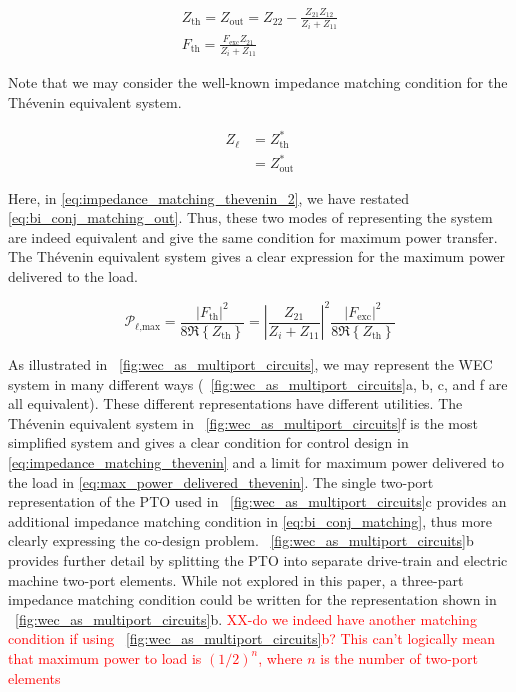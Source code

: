 \documentclass[lettersize,journal]{IEEEtran}
\newcommand{\rc}[1]{\textcolor{red}{#1}}
\begin{document}
\begin{subequations}
\begin{gather}
        Z_{\textrm{th}} = Z_{\textrm{out}} = Z_{22} - \frac{Z_{21} Z_{12}}{Z_{i} + Z_{11}} \label{eq:Thevenin_impedance} \\[0.5em]
        F_{\textrm{th}} = \frac{F_{\textrm{exc}} Z_{21}}{Z_i + Z_{11}} \label{eq:Thevenin_force}
\end{gather}
\end{subequations}

Note that we may consider the well-known impedance matching condition for the Th\'{e}venin equivalent system.

\begin{subequations}
\begin{align}
        Z_\ell &= Z_{\textrm{th}}^* \\
        &= Z_{\textrm{out}}^* \label{eq:impedance_matching_thevenin_2}
\end{align} \label{eq:impedance_matching_thevenin}
\end{subequations}

\noindent{}Here, in \eqref{eq:impedance_matching_thevenin_2}, we have restated \eqref{eq:bi_conj_matching_out}.
Thus, these two modes of representing the system are indeed equivalent and give the same condition for maximum power transfer.
The Th\'{e}venin equivalent system gives a clear expression for the maximum power delivered to the load.

\begin{equation}
        \mathcal{P}_{\ell\textrm{,max}} = \frac{| F_{\textrm{th}} |^2 }{ 8 \Re \left\{ Z_{\textrm{th}} \right\} }
        = \left| \frac{ Z_{21} }{ Z_i + Z_{11} } \right| ^2 \frac{ | F_{\textrm{exc}} |^2 }{ 8 \Re \left\{ Z_{\textrm{th}} \right\} } \label{eq:max_power_delivered_thevenin}
\end{equation}

As illustrated in \figurename~\ref{fig:wec_as_multiport_circuits}, we may represent the WEC system in many different ways (\figurename~\ref{fig:wec_as_multiport_circuits}a, b, c, and f are all equivalent).
These different representations have different utilities.
The Th\'{e}venin equivalent system in \figurename~\ref{fig:wec_as_multiport_circuits}f is the most simplified system and gives a clear condition for control design in \eqref{eq:impedance_matching_thevenin} and a limit for maximum power delivered to the load in \eqref{eq:max_power_delivered_thevenin}.
The single two-port representation of the PTO used in \figurename~\ref{fig:wec_as_multiport_circuits}c provides an additional impedance matching condition in \eqref{eq:bi_conj_matching}, thus more clearly expressing the co-design problem.
\figurename~\ref{fig:wec_as_multiport_circuits}b provides further detail by splitting the PTO into separate drive-train and electric machine two-port elements.
While not explored in this paper, a three-part impedance matching condition could be written for the representation shown in \figurename~\ref{fig:wec_as_multiport_circuits}b.
\rc{XX-do we indeed have another matching condition if using \figurename~\ref{fig:wec_as_multiport_circuits}b? This can't logically mean that maximum power to load is $(1/2)^n$, where $n$ is the number of two-port elements}
\end{document}
